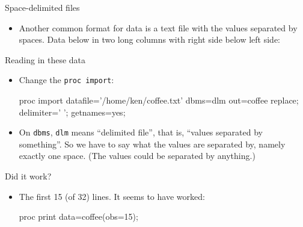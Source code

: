 \documentclass[unknownkeysallowed]{beamer}\usepackage[]{graphicx}\usepackage[]{color}
\begin{document}
\begin{frame}[fragile]{Space-delimited files}
  
  \begin{itemize}
  \item Another common format for data is a text file with the values
    separated by spaces. Data below in two long columns with right
    side below left side:
    
    \begin{footnotesize}
    \begin{multicols}{2}
      
    \end{multicols}
      
    \end{footnotesize}
    
  \end{itemize}
  
\end{frame}

\begin{frame}[fragile]{Reading in these data}
  
  \begin{itemize}
  \item Change the \texttt{proc import}:
    
    \begin{Datastep}
proc import 
  datafile='/home/ken/coffee.txt'
  dbms=dlm
  out=coffee
  replace;
  delimiter=' ';
  getnames=yes;
    \end{Datastep}
  \item On \texttt{dbms}, \texttt{dlm} means ``delimited file'', that
    is, ``values separated by something''. So we have to say what the
    values are separated by, namely exactly one space. (The values
    could be separated by anything.)
  \end{itemize}
  
\end{frame}

\begin{frame}[fragile]{Did it work?}
  
  \begin{itemize}
  \item The first 15 (of 32) lines. It seems to have worked:
    
    \begin{Sascode}[store=rc]
proc print data=coffee(obs=15);      
    \end{Sascode}
    
  \end{itemize}
  
\end{frame}
\end{document}
